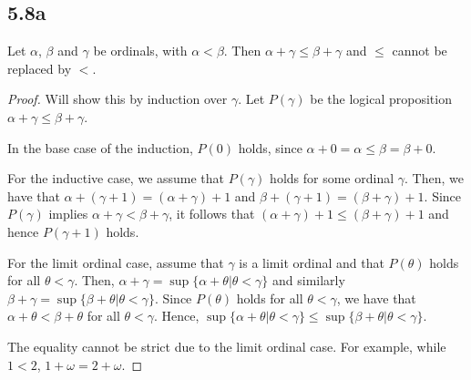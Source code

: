 \subsection*{5.8a} Let $\alpha$, $\beta$ and $\gamma$ be ordinals, with $\alpha < \beta$. Then $\alpha + \gamma \leq \beta + \gamma$ and $\leq$ cannot be replaced by $<$.

\begin{proof}
    Will show this by induction over $\gamma$. Let $P(\gamma)$ be the logical proposition $\alpha + \gamma \leq \beta + \gamma$.

    In the base case of the induction, $P(0)$ holds, since $\alpha + 0 = \alpha \leq \beta = \beta + 0$.

    For the inductive case, we assume that $P(\gamma)$ holds for some ordinal $\gamma$. Then, we have that $\alpha + (\gamma + 1) = (\alpha + \gamma) + 1$ and $\beta + (\gamma + 1) = (\beta + \gamma) + 1$. Since $P(\gamma)$ implies $\alpha + \gamma < \beta + \gamma$, it follows that $(\alpha + \gamma) + 1 \leq (\beta + \gamma) + 1$ and hence $P(\gamma + 1)$ holds.

    For the limit ordinal case, assume that $\gamma$ is a limit ordinal and that $P(\theta)$ holds for all $\theta < \gamma$. Then, $\alpha + \gamma = \sup\{\alpha + \theta | \theta < \gamma\}$ and similarly $\beta + \gamma = \sup\{\beta + \theta | \theta < \gamma\}$.  Since $P(\theta)$ holds for all $\theta < \gamma$, we have that $\alpha + \theta <\beta + \theta$ for all $\theta < \gamma$. Hence, $\sup\{\alpha + \theta | \theta < \gamma\} \leq \sup \{\beta + \theta | \theta < \gamma\}$.

    The equality cannot be strict due to the limit ordinal case. For example, while $1 < 2$, $1 + \omega = 2 + \omega$.
\end{proof}

